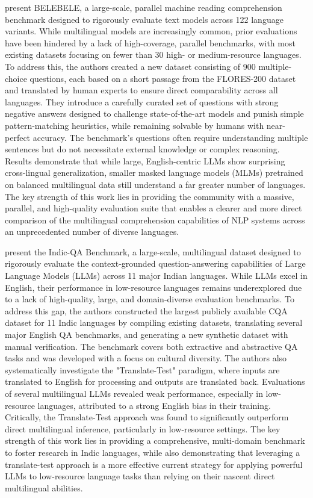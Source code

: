 \documentclass[acmsmall]{acmart}
\begin{document}
\citep{bandarkar2023belebele} present BELEBELE, a large-scale, parallel machine reading comprehension benchmark designed to rigorously evaluate text models across 122 language variants. While multilingual models are increasingly common, prior evaluations have been hindered by a lack of high-coverage, parallel benchmarks, with most existing datasets focusing on fewer than 30 high- or medium-resource languages. To address this, the authors created a new dataset consisting of 900 multiple-choice questions, each based on a short passage from the FLORES-200 dataset and translated by human experts to ensure direct comparability across all languages. They introduce a carefully curated set of questions with strong negative answers designed to challenge state-of-the-art models and punish simple pattern-matching heuristics, while remaining solvable by humans with near-perfect accuracy. The benchmark's questions often require understanding multiple sentences but do not necessitate external knowledge or complex reasoning. Results demonstrate that while large, English-centric LLMs show surprising cross-lingual generalization, smaller masked language models (MLMs) pretrained on balanced multilingual data still understand a far greater number of languages. The key strength of this work lies in providing the community with a massive, parallel, and high-quality evaluation suite that enables a clearer and more direct comparison of the multilingual comprehension capabilities of NLP systems across an unprecedented number of diverse languages.

\citep{singh2024indic} present the Indic-QA Benchmark, a large-scale, multilingual dataset designed to rigorously evaluate the context-grounded question-answering capabilities of Large Language Models (LLMs) across 11 major Indian languages. While LLMs excel in English, their performance in low-resource languages remains underexplored due to a lack of high-quality, large, and domain-diverse evaluation benchmarks. To address this gap, the authors constructed the largest publicly available CQA dataset for 11 Indic languages by compiling existing datasets, translating several major English QA benchmarks, and generating a new synthetic dataset with manual verification. The benchmark covers both extractive and abstractive QA tasks and was developed with a focus on cultural diversity. The authors also systematically investigate the "Translate-Test" paradigm, where inputs are translated to English for processing and outputs are translated back. Evaluations of several multilingual LLMs revealed weak performance, especially in low-resource languages, attributed to a strong English bias in their training. Critically, the Translate-Test approach was found to significantly outperform direct multilingual inference, particularly in low-resource settings. The key strength of this work lies in providing a comprehensive, multi-domain benchmark to foster research in Indic languages, while also demonstrating that leveraging a translate-test approach is a more effective current strategy for applying powerful LLMs to low-resource language tasks than relying on their nascent direct multilingual abilities.
\end{document}
